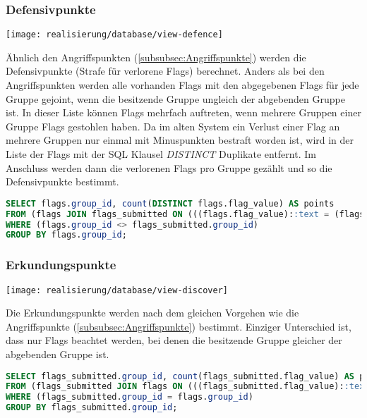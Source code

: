 \subsubsection{Defensivpunkte}
\begin{center}
	\texttt{[image: realisierung/database/view-defence]}
	\label{fig:realisierung-view-defence}
\end{center}

Ähnlich den Angriffspunkten (\ref{subsubsec:Angriffspunkte}) werden die Defensivpunkte (Strafe für verlorene Flags) berechnet.
Anders als bei den Angriffspunkten werden alle vorhanden Flags mit den abgegebenen Flags für jede Gruppe gejoint, wenn die besitzende Gruppe ungleich der abgebenden Gruppe ist. In dieser Liste können Flags mehrfach auftreten, wenn mehrere Gruppen einer Gruppe Flags gestohlen haben. Da im alten System ein Verlust einer Flag an mehrere Gruppen nur einmal mit Minuspunkten bestraft worden ist, wird in der Liste der Flags mit der SQL Klausel \textit{DISTINCT} Duplikate entfernt. Im Anschluss werden dann die verlorenen Flags pro Gruppe gezählt und so die Defensivpunkte bestimmt.

\begin{lstlisting}[frame=single, language=sql, caption={SQL View Denfensivpunkte}, captionpos=b, label={lst:database-offence-points}]
SELECT flags.group_id, count(DISTINCT flags.flag_value) AS points
FROM (flags JOIN flags_submitted ON (((flags.flag_value)::text = (flags_submitted.flag_value)::text)))
WHERE (flags.group_id <> flags_submitted.group_id)
GROUP BY flags.group_id;
\end{lstlisting}

\subsubsection{Erkundungspunkte}
\begin{center}
	\texttt{[image: realisierung/database/view-discover]}
	\label{fig:realisierung-view-discover}
\end{center}

Die Erkundungspunkte werden nach dem gleichen Vorgehen wie die Angriffspunkte (\ref{subsubsec:Angriffspunkte}) bestimmt. Einziger Unterschied ist, dass nur Flags beachtet werden, bei denen die besitzende Gruppe gleicher der abgebenden Gruppe ist.

\begin{lstlisting}[frame=single, language=sql, caption={SQL View Erkundungspunkte}, captionpos=b, label={lst:database-offence-points}]
SELECT flags_submitted.group_id, count(flags_submitted.flag_value) AS points
FROM (flags_submitted JOIN flags ON (((flags_submitted.flag_value)::text = (flags.flag_value)::text)))
WHERE (flags_submitted.group_id = flags.group_id)
GROUP BY flags_submitted.group_id;
\end{lstlisting}

